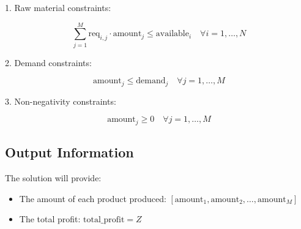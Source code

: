 \documentclass{article}
\begin{document}
1. Raw material constraints:

\[
\sum_{j=1}^{M} \text{req}_{i,j} \cdot \text{amount}_j \leq \text{available}_i \quad \forall i = 1, \ldots, N
\]

2. Demand constraints:

\[
\text{amount}_j \leq \text{demand}_j \quad \forall j = 1, \ldots, M
\]

3. Non-negativity constraints:

\[
\text{amount}_j \geq 0 \quad \forall j = 1, \ldots, M
\]

\subsection*{Output Information}

The solution will provide:
\begin{itemize}
    \item The amount of each product produced: \( [\text{amount}_1, \text{amount}_2, \ldots, \text{amount}_M] \)
    \item The total profit: \( \text{total\_profit} = Z \)
\end{itemize}
\end{document}
